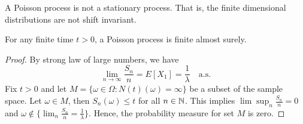 \documentclass[a4paper,10pt,english]{article}
\begin{document}
\begin{rem} A Poisson process is not a stationary process. That is, the finite dimensional distributions are not shift invariant. 
\end{rem}
\begin{lem} For any finite time $t > 0$, a Poisson process is finite almost surely.
\end{lem}
\begin{proof} By strong law of large numbers, we have 
\begin{equation*}
\lim_{n \to \infty} \frac{S_{n}}{n} = E[X_{1}] = \frac{1}{\lambda}\quad\mathrm{a.s.} 
\end{equation*}
Fix $t > 0$ and let $M = \{\omega \in \Omega: N(t)(\omega) = \infty \}$ be a subset of the sample space. Let $\omega \in M$, then $S_{n}(\omega)\leqslant t$ for all $n \in \mathbb{N}$. This implies $\lim\sup_n\frac{S_{n}}{n} = 0$  and $\omega \not\in \{\lim_n \frac{S_{n}}{n} = \frac{1}{\lambda} \}.$ Hence, the probability measure for set $M$ is zero. 
\end{proof}
\end{document}
